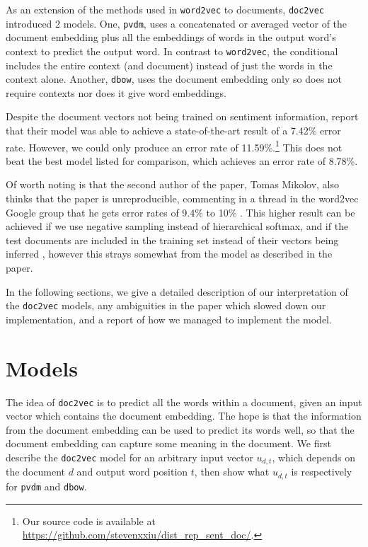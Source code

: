 \documentclass{article}
\begin{document}
As an extension of the methods used in \texttt{word2vec} to documents, \texttt{doc2vec} \citep{le_distributed_2014} introduced 2 models. One, \texttt{pvdm}, uses a concatenated or averaged vector of the document embedding plus all the embeddings of words in the output word's context to predict the output word. In contrast to \texttt{word2vec}, the conditional includes the entire context (and document) instead of just the words in the context alone. Another, \texttt{dbow}, uses the document embedding only so does not require contexts nor does it give word embeddings.

Despite the document vectors not being trained on sentiment information, \cite{le_distributed_2014} report that their model was able to achieve a state-of-the-art result of a 7.42\% error rate. However, we could only produce an error rate of 11.59\%.\footnote{Our source code is available at \url{https://github.com/stevenxxiu/dist_rep_sent_doc/}.} This does not beat the best model listed for comparison, which achieves an error rate of 8.78\%.

Of worth noting is that the second author of the paper, Tomas Mikolov, also thinks that the paper is unreproducible, commenting in a thread in the word2vec Google group that he gets error rates of 9.4\% to 10\% \citep{mikolov_distributed_2014} . This higher result can be achieved if we use negative sampling instead of hierarchical softmax, and if the test documents are included in the training set instead of their vectors being inferred \citep{mohr_gensim_2017}, however this strays somewhat from the model as described in the paper.

In the following sections, we give a detailed description of our interpretation of the \texttt{doc2vec} models, any ambiguities in the paper which slowed down our implementation, and a report of how we managed to implement the model.

\section{Models}
The idea of \texttt{doc2vec} is to predict all the words within a document, given an input vector which contains the document embedding. The hope is that the information from the document embedding can be used to predict its words well, so that the document embedding can capture some meaning in the document. We first describe the \texttt{doc2vec} model for an arbitrary input vector $u_{d,t}$, which depends on the document $d$ and output word position $t$, then show what $u_{d,t}$ is respectively for \texttt{pvdm} and \texttt{dbow}.
\end{document}

